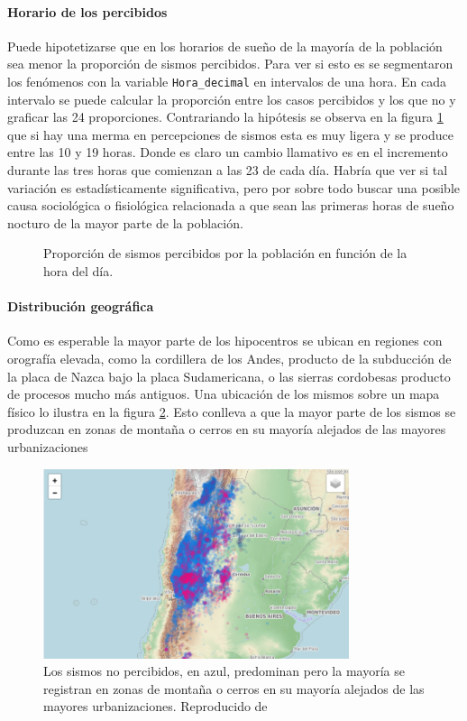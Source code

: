 \documentclass[a4paper]{report}
\begin{document}
\paragraph{Horario de los percibidos}
Puede hipotetizarse que en los horarios de sueño de la mayoría de la población sea menor la proporción de sismos percibidos.
Para ver si esto es se segmentaron los fenómenos con la variable \verb'Hora_decimal' en intervalos de una hora.
En cada intervalo se puede calcular la proporción entre los casos percibidos y los que no y graficar las 24 proporciones.
Contrariando la hipótesis se observa en la figura \ref{fig:histograma_percibidos_por_hora} que si hay una merma en percepciones de sismos esta es muy ligera y se produce entre las 10 y 19 horas.
Donde es claro un cambio llamativo es en el incremento durante las tres horas que comienzan a las 23 de cada día.
Habría que ver si tal variación es estadísticamente significativa, pero por sobre todo buscar una posible causa sociológica o fisiológica relacionada a que sean las primeras horas de sueño nocturo de la mayor parte de la población.

\begin{figure}[h]
\centering

\caption{Proporción de sismos percibidos por la población en función de la hora del día.}
\label{fig:histograma_percibidos_por_hora}
\end{figure}


\paragraph{Distribución geográfica}
Como es esperable la mayor parte de los hipocentros se ubican en regiones con orografía elevada, como la cordillera de los Andes, producto de la subducción de la placa de Nazca bajo la placa Sudamericana, o las sierras cordobesas producto de procesos mucho más antiguos. 
Una ubicación de los mismos sobre un mapa físico lo ilustra en la figura \ref{fig:mapa_sismos}.
Esto conlleva a que la mayor parte de los sismos se produzcan en zonas de montaña o cerros en su mayoría alejados de las mayores urbanizaciones
\begin{figure}[h]
\centering
\includegraphics[width=0.8\textwidth]{mapa_sismos.png}
\caption{Los sismos no percibidos, en azul, predominan pero la mayoría se registran en zonas de montaña o cerros en su mayoría alejados de las mayores urbanizaciones.
Reproducido de \cite{daniela_parada_ic-datasets-docencia_nodate}}
\label{fig:mapa_sismos}
\end{figure}
\end{document}
